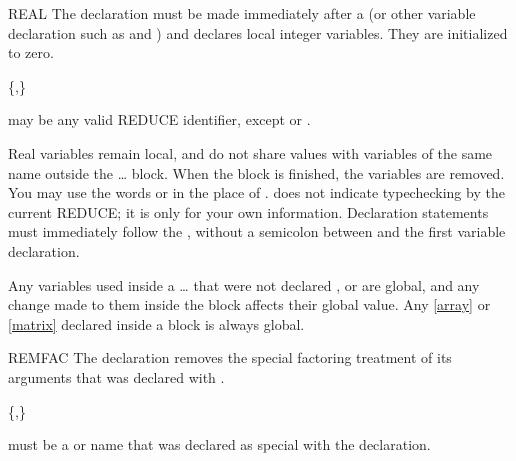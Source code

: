 \begin{Declaration}[real]{REAL}
The  declaration must be made immediately after a
 (or other variable declaration such as 
and ) and declares local integer variables.  They are
initialized to zero.
\begin{Syntax}
 \{,\}\optional
\end{Syntax}

 may be any valid REDUCE identifier, except
 or .

\begin{Comments}
Real variables remain local, and do not share values with variables of the
same name outside the \ldots{} block.  When the
block is finished, the variables are removed.  You may use the words
 or  in the place of .
 does not indicate typechecking by the current REDUCE; it is
only for your own information.  Declaration statements must immediately
follow the , without a semicolon between  and the
first variable declaration.

Any variables used inside a \ldots{} 
that were not declared ,  or  are
global, and any change made to them inside the block affects their global
value.  Any \ref{array} or \ref{matrix} declared inside a block is always
global.
\end{Comments}
\end{Declaration}


\begin{Declaration}[remfac]{REMFAC}
The  declaration removes the special factoring treatment of its
arguments that was declared with .
\begin{Syntax}
 \{,\}\repeated
\end{Syntax}

 must be a  or  name that
was declared as special with the  declaration.
\end{Declaration}


